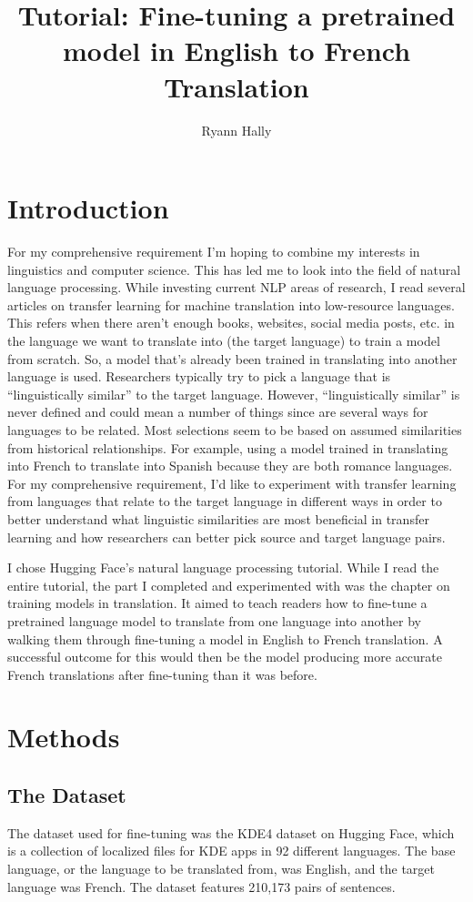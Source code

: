 \documentclass[10pt,twocolumn]{article}
\title{Tutorial: Fine-tuning a pretrained model in English to French Translation}
\author{Ryann Hally}
\affiliation{Occidental College}
\begin{document}
\maketitle
\section{Introduction}
For my comprehensive requirement I’m hoping to combine my interests in linguistics and computer science. This has led me to look into the field of natural language processing. While investing current NLP areas of research, I read several articles on transfer learning for machine translation into low-resource languages. This refers when there aren't enough books, websites, social media posts, etc. in the language we want to translate into (the target language) to train a model from scratch. So, a model that's already been trained in translating into another language is used. Researchers typically try to pick a language that is “linguistically similar” to the target language. However, “linguistically similar” is never defined and could mean a number of things since are several ways for languages to be related. Most selections seem to be based on assumed similarities from historical relationships. For example, using a model trained in translating into French to translate into Spanish because they are both romance languages. For my comprehensive requirement, I'd like to experiment with transfer learning from languages that relate to the target language in different ways in order to better understand what linguistic similarities are most beneficial in transfer learning and how researchers can better pick source and target language pairs.

I chose Hugging Face’s natural language processing tutorial. While I read the entire tutorial, the part I completed and experimented with was the chapter on training models in translation. It aimed to teach readers how to fine-tune a pretrained language model to translate from one language into another by walking them through fine-tuning a model in English to French translation. A successful outcome for this would then be the model producing more accurate French translations after fine-tuning than it was before.


\section{Methods}

\subsection{The Dataset}
The dataset used for fine-tuning was the KDE4 dataset on Hugging Face, which is a collection of localized files for KDE apps in 92 different languages. The base language, or the language to be translated from, was English, and the target language was French. The dataset features 210,173 pairs of sentences.
\end{document}
